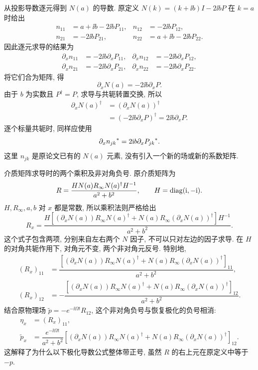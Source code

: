 \par\smallskip\noindent 从投影导数逐元得到 $N(a)$ 的导数.\quad
原定义 $N(k)=(k+\ii b)I-2\ii bP$ 在 $k=a$ 时给出
\begin{align*}
n_{11}&=a+\ii b-2\ii bP_{11},
&n_{12}&=-2\ii bP_{12},\\
n_{21}&=-2\ii bP_{21},
&n_{22}&=a+\ii b-2\ii bP_{22}.
\end{align*}
因此逐元求导的结果为
\begin{align*}
\partial_xn_{11}&=-2\ii b\partial_xP_{11},
&\partial_xn_{12}&=-2\ii b\partial_xP_{12},\\
\partial_xn_{21}&=-2\ii b\partial_xP_{21},
&\partial_xn_{22}&=-2\ii b\partial_xP_{22}.
\end{align*}
将它们合为矩阵, 得
\begin{equation*}
\partial_xN(a)=-2\ii b\partial_xP.
\end{equation*}
由于 $b$ 为实数且 $P^\dagger=P$, 求导与共轭转置交换, 所以
\begin{align*}
\partial_xN(a)^\dagger
&=(\partial_xN(a))^\dagger\\
&=(-2\ii b\partial_xP)^\dagger
=2\ii b\partial_xP.
\end{align*}
逐个标量共轭时, 同样应使用
\begin{equation*}
{\partial_xn_{jk}}^{*}
=2\mathrm{i} b{\partial_xP_{jk}}^{*}.
\end{equation*}
这里 $n_{jk}$ 是原论文已有的 $N(a)$ 元素, 没有引入一个新的场或新的系数矩阵.

\par\smallskip\noindent 介质矩阵求导时的两个乘积及非对角负号.\quad
原介质矩阵为
\begin{equation*}
R=\dfrac{HN(a)R_\infty N(a)^\dagger H^{-1}}{a^2+b^2},
\qquad H=\operatorname{diag}(\mathrm{i},-\mathrm{i}).
\end{equation*}
$H,R_\infty,a,b$ 对 $x$ 都是常数, 所以乘积法则严格给出
\begin{equation*}
R_x=\dfrac{H\left[
(\partial_xN(a))R_\infty N(a)^\dagger
+N(a)R_\infty(\partial_xN(a))^\dagger
\right]H^{-1}}{a^2+b^2}.
\end{equation*}
这个式子包含两项, 分别来自左右两个 $N$ 因子, 不可以只对左边的因子求导. 在 $H$ 的对角共轭作用下, 对角元不变, 两个非对角元反号. 特别地,
\begin{align*}
(R_x)_{11}
&=\dfrac{\left[
(\partial_xN(a))R_\infty N(a)^\dagger
+N(a)R_\infty(\partial_xN(a))^\dagger
\right]_{11}}{a^2+b^2},\\
(R_x)_{12}
&=-\dfrac{\left[
(\partial_xN(a))R_\infty N(a)^\dagger
+N(a)R_\infty(\partial_xN(a))^\dagger
\right]_{12}}{a^2+b^2}.
\end{align*}
结合原物理场 $\widetilde p=-e^{-\ii\Omega t}R_{12}$, 这个非对角负号与恢复极化的负号相消:
\begin{align*}
\eta_x&=(R_x)_{11},\\
\widetilde p_x
&=\dfrac{e^{-\ii\Omega t}}{a^2+b^2}
\left[
(\partial_xN(a))R_\infty N(a)^\dagger
+N(a)R_\infty(\partial_xN(a))^\dagger
\right]_{12}.
\end{align*}
这解释了为什么以下极化导数公式整体带正号, 虽然 $R$ 的右上元在原定义中等于 $-p$.

